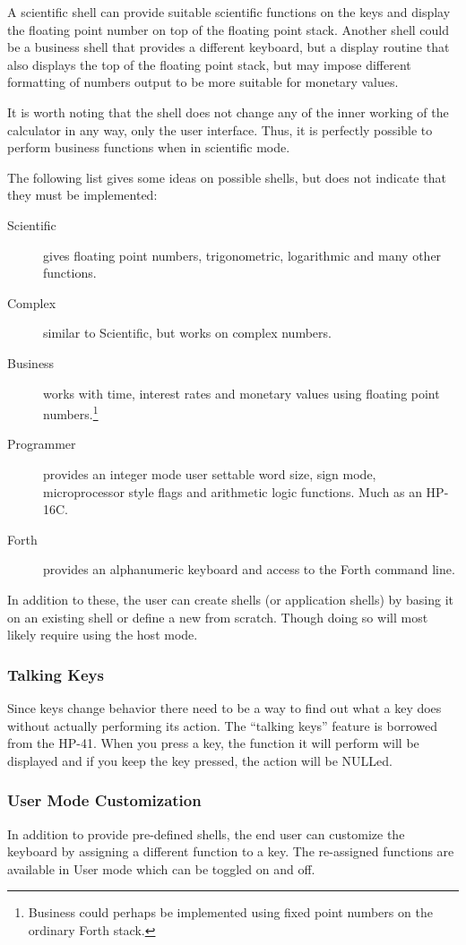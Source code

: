 \documentclass[a4paper]{article}
\begin{document}
A scientific shell can provide suitable scientific functions on the keys and display the floating point number on top of the floating point stack. Another shell could be a business shell that provides a different keyboard, but a display routine that also displays the top of the floating point stack, but may impose different formatting of numbers output to be more suitable for monetary values.

It is worth noting that the shell does not change any of the inner working of the calculator in any way, only  the user interface. Thus, it is perfectly possible to perform business functions when in scientific mode.

The following list gives some ideas on possible shells, but does not indicate that they must be implemented:
\begin{description}
\item[Scientific] gives floating point numbers, trigonometric, logarithmic and many other functions.
\item[Complex] similar to Scientific, but works on complex numbers.
\item[Business] works with time, interest rates and monetary values using floating point numbers.\footnote{Business could perhaps be implemented using fixed point numbers on the ordinary Forth stack.}
\item[Programmer] provides an integer mode user settable word size, sign mode, microprocessor style flags and arithmetic logic functions. Much as an HP-16C.
\item[Forth] provides an alphanumeric keyboard and access to the Forth command line.
\end{description}

In addition to these, the user can create shells (or application shells) by basing it on an existing shell or define a new from scratch. Though doing so will most likely require using the host mode.

\subsubsection{Talking Keys}
Since keys change behavior there need to be a way to find out what a key does without actually performing its action. The ``talking keys'' feature is borrowed from the HP-41. When you press a key, the function it will perform will be displayed and if you keep the key pressed, the action will be NULLed.

\subsubsection{User Mode Customization}
In addition to provide pre-defined shells, the end user can customize the keyboard by assigning a different function to a key. The re-assigned functions are available in User mode which can be toggled on and off.
\end{document}
